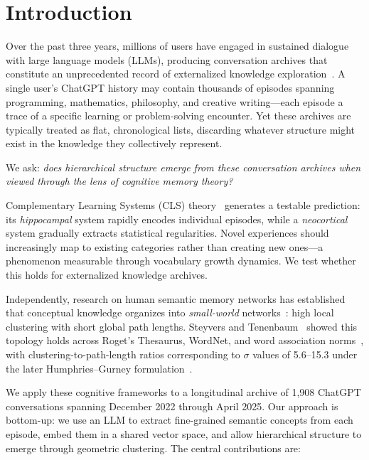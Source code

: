 \documentclass{svproc}
\begin{document}
\section{Introduction}
\label{sec:intro}

Over the past three years, millions of users have engaged in sustained dialogue
with large language models (LLMs), producing conversation archives that constitute
an unprecedented record of externalized knowledge exploration~\cite{zhao2024wildchat}.
A single user's ChatGPT history may contain thousands of episodes spanning
programming, mathematics, philosophy, and creative writing---each episode a trace
of a specific learning or problem-solving encounter. Yet these archives are
typically treated as flat, chronological lists, discarding whatever structure might
exist in the knowledge they collectively represent.

We ask: \emph{does hierarchical structure emerge from these conversation archives
when viewed through the lens of cognitive memory theory?}

Complementary Learning Systems (CLS)
theory~\cite{mcclelland1995there,kumaran2016learning} generates a testable
prediction: its \emph{hippocampal} system rapidly encodes individual episodes,
while a \emph{neocortical} system gradually extracts statistical regularities.
Novel experiences should increasingly map to existing categories rather than
creating new ones---a phenomenon measurable through vocabulary growth dynamics.
We test whether this holds for externalized knowledge archives.

Independently, research on human semantic memory networks has established that
conceptual knowledge organizes into \emph{small-world}
networks~\cite{steyvers2005large,siew2019cognitive}: high local clustering with
short global path lengths. Steyvers and Tenenbaum~\cite{steyvers2005large} showed this topology holds
across Roget's Thesaurus, WordNet, and word association
norms~\cite{dedeyne2019small}, with clustering-to-path-length ratios
corresponding to $\sigma$ values of 5.6--15.3 under the later Humphries--Gurney
formulation~\cite{humphries2008network}.

We apply these cognitive frameworks to a longitudinal archive of 1,908 ChatGPT
conversations spanning December 2022 through April 2025. Our approach is
bottom-up: we use an LLM to extract fine-grained semantic concepts from each
episode, embed them in a shared vector space, and allow hierarchical structure
to emerge through geometric clustering. The central contributions are:
\end{document}
